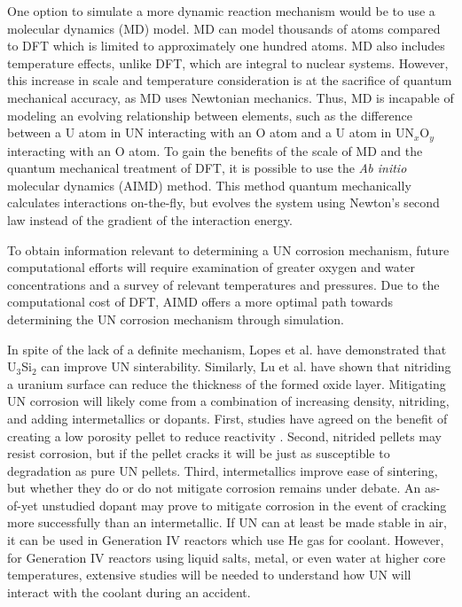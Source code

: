 \documentclass[11pt]{article}
\begin{document}
\begin{multicols}{2}
One option to simulate a more dynamic reaction mechanism would be to use a molecular dynamics (MD) model. MD can model thousands of atoms compared to DFT which is limited to approximately one hundred atoms. MD also includes temperature effects, unlike DFT, which are integral to nuclear systems. However, this increase in scale and temperature consideration is at the sacrifice of quantum mechanical accuracy, as MD uses Newtonian mechanics. Thus, MD is incapable of modeling an evolving relationship between elements, such as the difference between a U atom in UN interacting with an O atom and a U atom in UN$_{x}$O$_{y}$ interacting with an O atom. To gain the benefits of the scale of MD and the quantum mechanical treatment of DFT, it is possible to use the \textit{Ab initio} molecular dynamics (AIMD) method. This method quantum mechanically calculates interactions on-the-fly, but evolves the system using Newton's second law instead of the gradient of the interaction energy. 
\par 
To obtain information relevant to determining a UN corrosion mechanism, future computational efforts will require examination of greater oxygen and water concentrations and a survey of relevant temperatures and pressures. Due to the computational cost of DFT, AIMD offers a more optimal path towards determining the UN corrosion mechanism through simulation.
\par In spite of the lack of a definite mechanism, Lopes et al. \cite{Lopes2017} have demonstrated that U$_{3}$Si$_{2}$ can improve UN sinterability. Similarly, Lu et al. \cite{Lu2016} have shown that nitriding a uranium surface can reduce the thickness of the formed oxide layer.
Mitigating UN corrosion will likely come from a combination of increasing density, nitriding, and adding intermetallics or dopants. First, studies have agreed on the benefit of creating a low porosity pellet to reduce reactivity \cite{Lopes2017,Johnson2016,Jolkkonen2017}. Second, nitrided pellets may resist corrosion, but if the pellet cracks it will be just as susceptible to degradation as pure UN pellets. Third, intermetallics improve ease of sintering, but whether they do or do not mitigate corrosion remains under debate. An as-of-yet unstudied dopant may prove to mitigate corrosion in the event of cracking more successfully than an intermetallic. If UN can at least be made stable in air, it can be used in Generation IV reactors which use He gas for coolant. However, for Generation IV reactors using liquid salts, metal, or even water at higher core temperatures, extensive studies will be needed to understand how UN will interact with the coolant during an accident.

\end{multicols}
\end{document}
